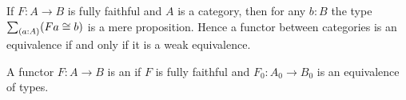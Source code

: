 \documentclass[hott-all.tex]{subfiles}
\begin{document}
\begin{lem}
  If $F:A\to B$ is fully faithful and $A$ is a category, then for any $b:B$ the type $\sm{a:A} (Fa\cong b)$ is a mere proposition.
  Hence a functor between categories is an equivalence if and only if it is a weak equivalence.
\end{lem}
%

%

\begin{defn}
  A functor $F:A\to B$ is an 
  if $F$ is fully faithful and $F_0:A_0\to B_0$ is an equivalence of types.
\end{defn}

%
\end{document}
